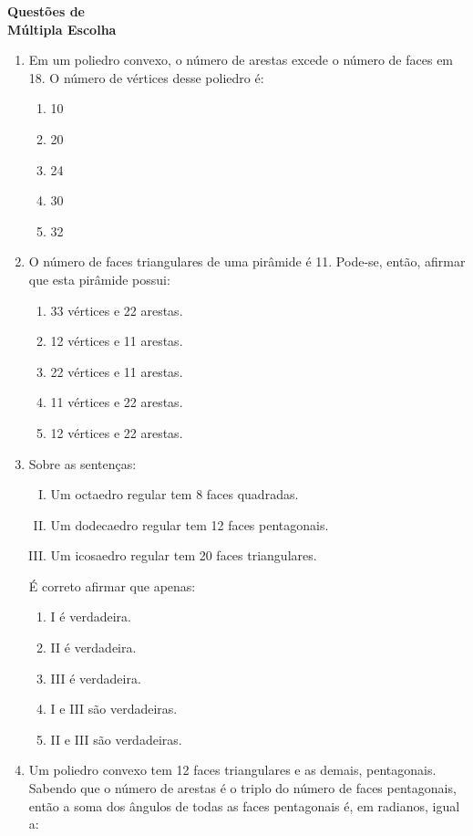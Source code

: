 \documentclass[oneside,a4paper,12pt]{article}
\begin{document}
\newpage
\begin{center}
\textbf{Questões de\\Múltipla Escolha}
\end{center}

\begin{enumerate}
\item Em um poliedro convexo, o número de arestas excede o número de faces em 18. O número de vértices desse poliedro é:
\begin{enumerate}
\item 10
\item 20
\item 24
\item 30
\item 32
\end{enumerate}

\item  O número de faces triangulares de uma pirâmide é 11. Pode-se, então, afirmar que esta pirâmide possui:
\begin{enumerate}
\item 33 vértices e 22 arestas.
\item 12 vértices e 11 arestas.
\item 22 vértices e 11 arestas.
\item 11 vértices e 22 arestas.
\item 12 vértices e 22 arestas.
\end{enumerate}

\item Sobre as sentenças:

\begin{enumerate}[I.]
\item Um octaedro regular tem 8 faces quadradas.
\item Um dodecaedro regular tem 12 faces pentagonais.
\item Um icosaedro regular tem 20 faces triangulares.
\end{enumerate}
É correto afirmar que apenas:
\begin{enumerate}
\item I é verdadeira.
\item II é verdadeira.
\item III é verdadeira.
\item I e III são verdadeiras.
\item II e III são verdadeiras.
\end{enumerate}

\item Um poliedro convexo tem 12 faces triangulares e as demais, pentagonais. Sabendo que o número de arestas é o triplo do número de faces pentagonais, então a soma dos ângulos de todas as faces pentagonais é, em radianos, igual a:


\end{enumerate}
\end{document}
